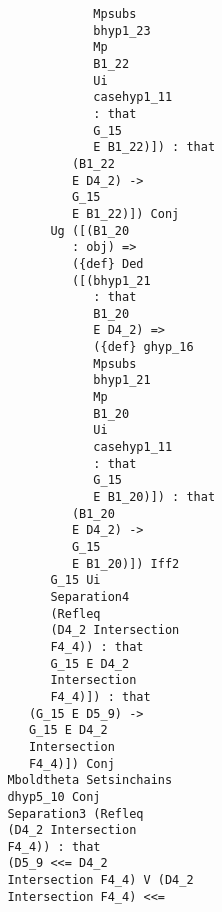 \documentclass[12pt]{article}
\begin{document}
\begin{verbatim}
                                        Mpsubs 
                                        bhyp1_23 
                                        Mp 
                                        B1_22 
                                        Ui 
                                        casehyp1_11 
                                        : that 
                                        G_15 
                                        E B1_22)]) : that 
                                     (B1_22 
                                     E D4_2) -> 
                                     G_15 
                                     E B1_22)]) Conj 
                                  Ug ([(B1_20 
                                     : obj) => 
                                     ({def} Ded 
                                     ([(bhyp1_21 
                                        : that 
                                        B1_20 
                                        E D4_2) => 
                                        ({def} ghyp_16 
                                        Mpsubs 
                                        bhyp1_21 
                                        Mp 
                                        B1_20 
                                        Ui 
                                        casehyp1_11 
                                        : that 
                                        G_15 
                                        E B1_20)]) : that 
                                     (B1_20 
                                     E D4_2) -> 
                                     G_15 
                                     E B1_20)]) Iff2 
                                  G_15 Ui 
                                  Separation4 
                                  (Refleq 
                                  (D4_2 Intersection 
                                  F4_4)) : that 
                                  G_15 E D4_2 
                                  Intersection 
                                  F4_4)]) : that 
                               (G_15 E D5_9) -> 
                               G_15 E D4_2 
                               Intersection 
                               F4_4)]) Conj 
                            Mboldtheta Setsinchains 
                            dhyp5_10 Conj 
                            Separation3 (Refleq 
                            (D4_2 Intersection 
                            F4_4)) : that 
                            (D5_9 <<= D4_2 
                            Intersection F4_4) V (D4_2 
                            Intersection F4_4) <<= 

\end{verbatim}
\end{document}
